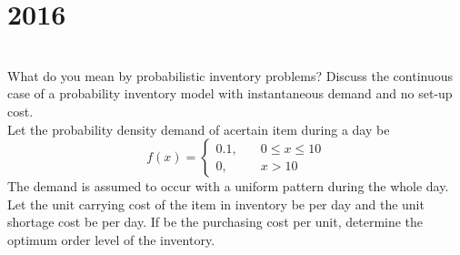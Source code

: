 \section*{2016}
\vspace{-.5cm}
\hrulefill \smallskip\\
 What do you mean by probabilistic inventory problems? Discuss the continuous case of a probability inventory model with instantaneous demand and no set-up cost. \\
Let the probability density demand of acertain item during a day be
\[ f(x) = \begin{cases} 0.1, \quad & 0\leq x \leq 10 \\
                        0, \quad & x>10 \end{cases} \]
The demand is assumed to occur with a uniform pattern during the whole day. Let the unit carrying cost of the item in inventory be  per day and the unit shortage cost be  per day. If  be the purchasing cost per unit, determine the optimum order level of the inventory.